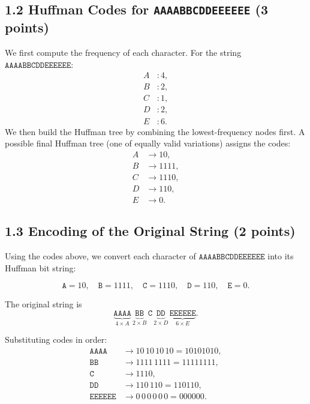 \documentclass[12pt]{article}
\begin{document}
	\subsection*{1.2 Huffman Codes for \texttt{AAAABBCDDEEEEEE} (3 points)}
	We first compute the frequency of each character. For the string \(\texttt{AAAABBCDDEEEEEE}\):
	\[
	\begin{aligned}
		A &: 4,\\
		B &: 2,\\
		C &: 1,\\
		D &: 2,\\
		E &: 6.
	\end{aligned}
	\]
	We then build the Huffman tree by combining the lowest-frequency nodes first. A possible final Huffman tree (one of equally valid variations) assigns the codes:
	\[
	\begin{aligned}
		A &\rightarrow 10,\\
		B &\rightarrow 1111,\\
		C &\rightarrow 1110,\\
		D &\rightarrow 110,\\
		E &\rightarrow 0.
	\end{aligned}
	\]
	
	\subsection*{1.3 Encoding of the Original String (2 points)}
	Using the codes above, we convert each character of \(\texttt{AAAABBCDDEEEEEE}\) into its Huffman bit string:
	
	\[
	\texttt{A} = 10,\quad
	\texttt{B} = 1111,\quad
	\texttt{C} = 1110,\quad
	\texttt{D} = 110,\quad
	\texttt{E} = 0.
	\]
	
	\noindent The original string is 
	\[
	\underbrace{\texttt{AAAA}}_{4\times A}\,
	\underbrace{\texttt{BB}}_{2\times B}\,
	\texttt{C}\,
	\underbrace{\texttt{DD}}_{2\times D}\,
	\underbrace{\texttt{EEEEEE}}_{6\times E}.
	\]
	
	\noindent Substituting codes in order:
	\[
	\begin{aligned}
		\texttt{AAAA} &\rightarrow 10\,10\,10\,10 = 10101010,\\
		\texttt{BB}  &\rightarrow 1111\,1111 = 11111111,\\
		\texttt{C}    &\rightarrow 1110,\\
		\texttt{DD}  &\rightarrow 110\,110 = 110110,\\
		\texttt{EEEEEE} &\rightarrow 0\,0\,0\,0\,0\,0 = 000000.
	\end{aligned}
	\]
	
\end{document}
